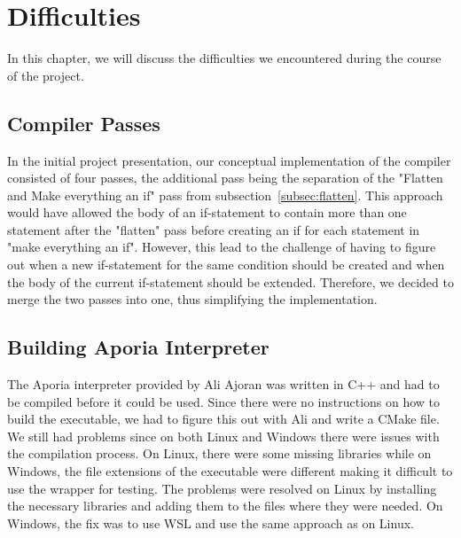 \newpage
\section{Difficulties}
In this chapter, we will discuss the difficulties we encountered during the course of the project.

\subsection{Compiler Passes}
In the initial project presentation, our conceptual implementation of the compiler consisted of four passes, the additional pass being the separation of the "Flatten and Make everything an if" pass from subsection~\ref{subsec:flatten}. This approach would have allowed the body of an if-statement to contain more than one statement after the "flatten" pass before creating an if for each statement in "make everything an if". However, this lead to the challenge of having to figure out when a new if-statement for the same condition should be created and when the body of the current if-statement should be extended. Therefore, we decided to merge the two passes into one, thus simplifying the implementation.

\subsection{Building Aporia Interpreter}
The Aporia interpreter provided by Ali Ajoran was written in C++ and had to be compiled before it could be used. Since there were no instructions on how to build the executable, we had to figure this out with Ali and write a CMake file. We still had problems since on both Linux and Windows there were issues with the compilation process. On Linux, there were some missing libraries while on Windows, the file extensions of the executable were different making it difficult to use the wrapper for testing. The problems were resolved on Linux by installing the necessary libraries and adding them to the files where they were needed. On Windows, the fix was to use WSL and use the same approach as on Linux.

